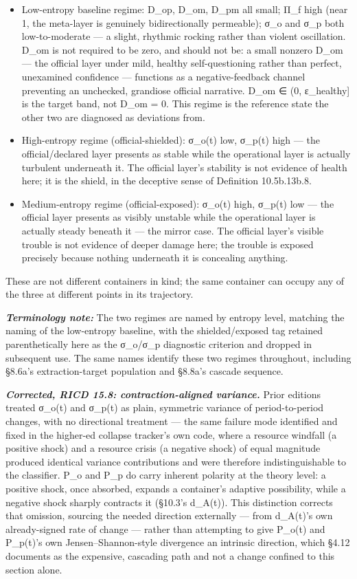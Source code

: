 \documentclass[
]{article}
\begin{document}
\begin{itemize}
\item
  Low-entropy baseline regime: D\_op, D\_om, D\_pm all small; Π\_f high
  (near 1, the meta-layer is genuinely bidirectionally permeable); σ\_o
  and σ\_p both low-to-moderate --- a slight, rhythmic rocking rather
  than violent oscillation. D\_om is not required to be zero, and should
  not be: a small nonzero D\_om --- the official layer under mild,
  healthy self-questioning rather than perfect, unexamined confidence
  --- functions as a negative-feedback channel preventing an unchecked,
  grandiose official narrative. D\_om ∈ (0, ε\_healthy{]} is the target
  band, not D\_om = 0. This regime is the reference state the other two
  are diagnosed as deviations from.
\item
  High-entropy regime (official-shielded): σ\_o(t) low, σ\_p(t) high ---
  the official/declared layer presents as stable while the operational
  layer is actually turbulent underneath it. The official layer's
  stability is not evidence of health here; it is the shield, in the
  deceptive sense of Definition 10.5b.13b.8.
\item
  Medium-entropy regime (official-exposed): σ\_o(t) high, σ\_p(t) low
  --- the official layer presents as visibly unstable while the
  operational layer is actually steady beneath it --- the mirror case.
  The official layer's visible trouble is not evidence of deeper damage
  here; the trouble is exposed precisely because nothing underneath it
  is concealing anything.
\end{itemize}

These are not different containers in kind; the same container can
occupy any of the three at different points in its trajectory.

\emph{\textbf{Terminology note:}} The two regimes are named by entropy
level, matching the naming of the low-entropy baseline, with the
shielded/exposed tag retained parenthetically here as the σ\_o/σ\_p
diagnostic criterion and dropped in subsequent use. The same names
identify these two regimes throughout, including §8.6a's
extraction-target population and §8.8a's cascade sequence.

\emph{\textbf{Corrected, RICD 15.8: contraction-aligned variance.}}
Prior editions treated σ\_o(t) and σ\_p(t) as plain, symmetric variance
of period-to-period changes, with no directional treatment --- the same
failure mode identified and fixed in the higher-ed collapse tracker's
own code, where a resource windfall (a positive shock) and a resource
crisis (a negative shock) of equal magnitude produced identical variance
contributions and were therefore indistinguishable to the classifier.
P\_o and P\_p do carry inherent polarity at the theory level: a positive
shock, once absorbed, expands a container's adaptive possibility, while
a negative shock sharply contracts it (§10.3's d\_A(t)). This
distinction corrects that omission, sourcing the needed direction
externally --- from d\_A(t)'s own already-signed rate of change ---
rather than attempting to give P\_o(t) and P\_p(t)'s own
Jensen--Shannon-style divergence an intrinsic direction, which §4.12
documents as the expensive, cascading path and not a change confined to
this section alone.
\end{document}
